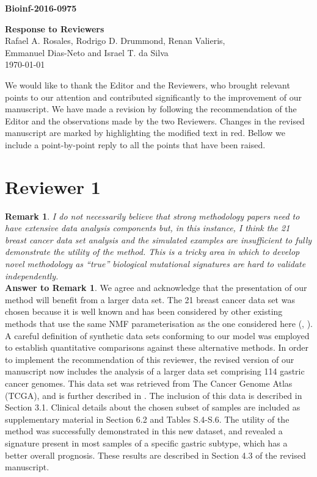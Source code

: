 \documentclass[11pt]{amsart}
\begin{document}
\title[BIOINF-2016-0975]{}

{\bf Bioinf-2016-0975}\hfill\\[1em]

\begin{center}
{\Large\bf Response to Reviewers}\\[2em]

{\large Rafael A. Rosales,
  Rodrigo D. Drummond,
  Renan Valieris,\\[0.25em]
  Emmanuel Dias-Neto and
  Israel T. da Silva}\\[1.5em]

\today\\[2em]
\end{center}
We would like to thank the Editor and the Reviewers, who brought relevant points to our attention and contributed significantly to the improvement of our manuscript. We have made a  revision by following the recommendation of the Editor and the observations made by the two Reviewers. Changes in the revised manuscript are marked by highlighting the modified text in red. Bellow we include a point-by-point reply to all the points that have been raised.

\section*{Reviewer 1}

\textbf{Remark 1}. \emph{I do not necessarily believe that strong
methodology papers need to have extensive data analysis components
but, in this instance, I think the 21 breast cancer data set analysis and the simulated examples are insufficient to fully demonstrate the utility of the method. This is a tricky area in which to develop novel methodology as ``true'' biological mutational signatures are hard to validate independently.}
\\

\textbf{Answer to Remark 1}. We agree and acknowledge that the presentation of our method will benefit from a larger data set. The 21 breast cancer data set was chosen because it is well known and has been considered by other existing methods that use the same NMF parameterisation as the one considered here (\cite{A}, \cite{FICMV}). A careful definition of synthetic data sets conforming to our model was employed to establish quantitative comparisons against these alternative methods.  In order to implement the recommendation of this reviewer, the revised
version of our manuscript now includes the analysis of a larger data set comprising 114 gastric cancer genomes. This data set was retrieved from The Cancer Genome Atlas (TCGA), and is further described in \cite{gastrico}. The inclusion of this data is described in Section 3.1. Clinical details about the chosen subset of samples are included as supplementary material in Section 6.2 and Tables S.4-S.6. The utility of the method was successfully demonstrated in this new dataset, and revealed a signature present in most samples of a specific gastric subtype, which has a better overall prognosis. These results are described in Section 4.3 of the revised manuscript.
\\
\end{document}
